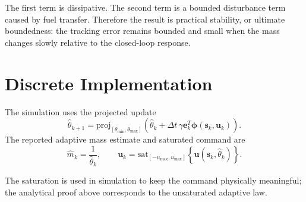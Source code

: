 \documentclass[11pt,a4paper]{article}
\begin{document}
The first term is dissipative. The second term is a bounded disturbance term
caused by fuel transfer. Therefore the result is practical stability, or
ultimate boundedness: the tracking error remains bounded and small when the
mass changes slowly relative to the closed-loop response.

\section{Discrete Implementation}

The simulation uses the projected update
\[
\hat\theta_{k+1}
=
\mathrm{proj}_{[\theta_{\min},\theta_{\max}]}
\left(
\hat\theta_k
+
\Delta t\,\gamma\bm e_k^T\bm\phi(\bm s_k,\bm u_k)
\right).
\]
The reported adaptive mass estimate and saturated command are
\[
\hat m_k=\frac{1}{\hat\theta_k},
\qquad
\bm u_k
=
\mathrm{sat}_{[-u_{\max},u_{\max}]}
\left\{
\bm u(\bm s_k,\hat\theta_k)
\right\}.
\]

The saturation is used in simulation to keep the command physically
meaningful; the analytical proof above corresponds to the unsaturated
adaptive law.
\end{document}
